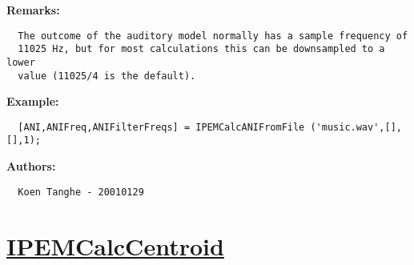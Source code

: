 \textbf{Remarks:}
\begin{verbatim}  The outcome of the auditory model normally has a sample frequency of
  11025 Hz, but for most calculations this can be downsampled to a lower
  value (11025/4 is the default).

\end{verbatim}
\textbf{Example:}
\begin{verbatim}  [ANI,ANIFreq,ANIFilterFreqs] = IPEMCalcANIFromFile ('music.wav',[],[],1);

\end{verbatim}
\textbf{Authors:}
\begin{verbatim}  Koen Tanghe - 20010129
\end{verbatim}


\newpage
\section*{\hyperlink{Concepts:IPEMCalcCentroid}{IPEMCalcCentroid}}
\hypertarget{FuncRef:IPEMCalcCentroid}{}

